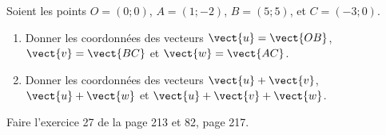 
\begin{exercice}\label{exosmath-0596}

    Soient les points \( O=(0;0)\), \( A=(1;-2)\), \( B=(5;5)\), et \( C=(-3;0)\).
    \begin{enumerate}
        \item
            Donner les coordonnées des vecteurs \( \vect{ u }=\vect{ OB }\), \( \vect{ v }=\vect{ BC }\) et \( \vect{ w }=\vect{ AC }\).
        \item
            Donner les coordonnées des vecteurs \( \vect{ u }+\vect{ v }\), \( \vect{ u }+\vect{ w }\) et \( \vect{ u }+\vect{ v }+\vect{ w }\).
    \end{enumerate}

    Faire l'exercice 27 de la page 213 et 82, page 217.

\end{exercice}
